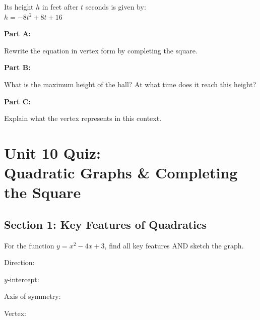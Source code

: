 \documentclass[12pt]{article}
\begin{document}
			Its height $h$ in feet after $t$ seconds is given by:\\

			$h = -8t^2 + 8t + 16$

			\vspace{0.5cm}

			\textbf{Part A:}
            
            Rewrite the equation in vertex form by completing the square.

			\vspace{5cm}

			\textbf{Part B:}
            
            What is the maximum height of the ball? At what time does it reach this height?

			\vspace{4cm}

			\textbf{Part C:}
            
            Explain what the vertex represents in this context.

			\newpage

	\section*{Unit 10 Quiz: \\ Quadratic Graphs \& Completing the Square}

		\subsection*{Section 1: Key Features of Quadratics}

			For the function $y = x^2 - 4x + 3$, find all key features AND sketch the graph.

			\vspace{3cm}

			Direction: \underline{\hspace{3in}}

			\vspace{0.5cm}

			$y$-intercept: \underline{\hspace{3in}}

			\vspace{0.5cm}

			Axis of symmetry: \underline{\hspace{3in}}

			\vspace{0.5cm}

			Vertex: \underline{\hspace{3in}}
\end{document}
